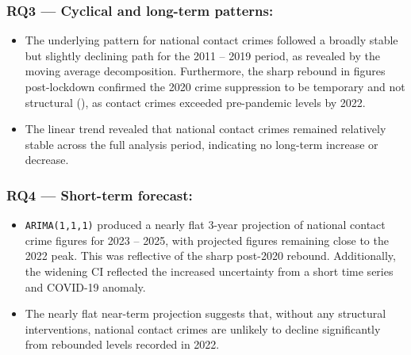 \documentclass[titlepage, 12pt, oneside]{article}
\numberwithin{equation}{section}
\begin{document}
\begin{tcolorbox}[
		colback=darkgreen!8!white,
		colframe=darkgreen,
		title={\textbf{Key Findings}},
		fonttitle=\bfseries,
		rounded corners,
		breakable]
	\subsubsection*{RQ3 --- Cyclical and long-term patterns:}
	\begin{itemize}
		\item The underlying pattern for national contact crimes followed a broadly stable but slightly declining path for the 2011 -- 2019 period, as revealed by the moving average decomposition. Furthermore, the sharp rebound in figures post-lockdown confirmed the 2020 crime suppression to be temporary and not structural (\cite{faull2021}), as contact crimes exceeded pre-pandemic levels by 2022. 
		\item The linear trend revealed that national contact crimes remained relatively stable across the full analysis period, indicating no long-term increase or decrease.
	\end{itemize}	
	\subsubsection*{RQ4 --- Short-term forecast:}
	\begin{itemize}
		\item \texttt{ARIMA(1,1,1)} produced a nearly flat 3-year projection of national contact crime figures for 2023 -- 2025, with projected figures remaining close to the 2022 peak. This was reflective of the sharp post-2020 rebound. Additionally, the widening CI reflected the increased uncertainty from a short time series and COVID-19 anomaly.
		\item The nearly flat near-term projection suggests that, without any structural interventions, national contact crimes are unlikely to decline significantly from rebounded levels recorded in 2022. 
	\end{itemize}	
	\end{tcolorbox}
	
\end{document}
